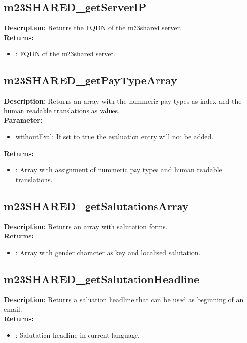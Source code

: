 \subsection{m23SHARED\_getServerIP}
\textbf{Description:} Returns the FQDN of the m23shared server.\\
\textbf{Returns:}
\begin{itemize}
\item : FQDN of the m23shared server.
\end{itemize}

\subsection{m23SHARED\_getPayTypeArray}
\textbf{Description:} Returns an array with the nummeric pay types as index and the human readable translations as values.\\
\textbf{Parameter:}
\begin{itemize}
\item withoutEval: If set to true the evaluation entry will not be added.
\end{itemize}
\textbf{Returns:}
\begin{itemize}
\item : Array with assignment of nummeric pay types and human readable translations.
\end{itemize}

\subsection{m23SHARED\_getSalutationsArray}
\textbf{Description:} Returns an array with salutation forms.\\
\textbf{Returns:}
\begin{itemize}
\item : Array with gender character as key and localised salutation.
\end{itemize}

\subsection{m23SHARED\_getSalutationHeadline}
\textbf{Description:} Returns a saluation headline that can be used as beginning of an email.\\
\textbf{Returns:}
\begin{itemize}
\item : Salutation headline in current language.
\end{itemize}


